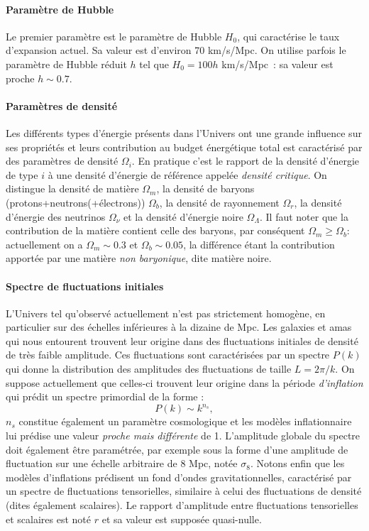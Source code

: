 \paragraph{Paramètre de Hubble} Le premier paramètre est le paramètre de Hubble $H_0$, qui caractérise le taux d'expansion actuel. Sa valeur est d'environ 70 km/s/Mpc. On utilise parfois le paramètre de Hubble réduit $h$ tel que $H_0=100 h$ km/s/Mpc~: sa valeur est proche $h\sim 0.7$.

\paragraph{Paramètres de densité} Les différents types d'énergie présents dans l'Univers ont une grande influence sur ses propriétés et leurs contribution au budget énergétique total est caractérisé par des paramètres de densité $\Omega_i$. En pratique c'est le rapport de la densité d'énergie de type $i$ à une densité d'énergie de référence appelée \textit{densité critique}. On distingue la densité de matière $\Omega_m$, la densité de baryons (protons+neutrons(+électrons)) $\Omega_b$, la densité de rayonnement $\Omega_r$, la densité d'énergie des neutrinos $\Omega_\nu$ et la densité d'énergie noire $\Omega_\Lambda$. Il faut noter que la contribution de la matière contient celle des baryons, par conséquent $\Omega_m\ge\Omega_b$: actuellement on a $\Omega_m\sim 0.3$ et $\Omega_b\sim 0.05$, la différence étant la contribution apportée par une matière \textit{non baryonique}, dite matière noire.

\paragraph{Spectre de fluctuations initiales} L'Univers tel qu'observé actuellement n'est pas strictement homogène, en particulier sur des échelles inférieures à la dizaine de Mpc. Les galaxies et amas qui nous entourent trouvent leur origine dans des fluctuations initiales de densité de très faible amplitude. Ces fluctuations sont caractérisées par un spectre  $P(k)$ qui donne la distribution des amplitudes des fluctuations de taille $L=2\pi/k$. On suppose actuellement que celles-ci trouvent leur origine dans la période \textit{d'inflation} qui prédit un spectre primordial de la forme :
\begin{equation}
P(k)\sim  k^{n_s},
\end{equation} 
$n_s$ constitue également un paramètre cosmologique et les modèles inflationnaire lui prédise une valeur \textit{proche mais différente} de 1. L'amplitude globale du spectre doit également être paramétrée, par exemple sous la forme d'une amplitude de fluctuation sur une échelle arbitraire de 8 Mpc, notée $\sigma_8$. Notons enfin que les modèles d'inflations prédisent un fond d'ondes gravitationnelles, caractérisé par un spectre de fluctuations tensorielles, similaire à celui des fluctuations de densité (dites également scalaires). Le rapport d'amplitude entre fluctuations tensorielles et scalaires est noté $r$ et sa valeur est supposée quasi-nulle.

